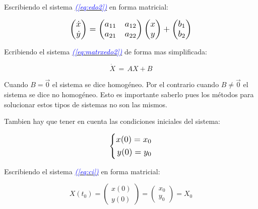 \documentclass[12pt,a4paper]{report} %
\newcommand{\eref}[1]{\hyperref[#1]{\textcolor{blue}{\textit{(\ref*{#1})}}}}
\begin{document}
	Escribiendo el sistema \eref{eq:edo2} en forma matricial:
	
	\begin{equation}
		\label{eq:matrxedo2}
		\scalebox{1.2}{$\displaystyle
		\begin{pmatrix}
			\dot{x}\\
			\dot{y}\\
		\end{pmatrix} =
		\begin{pmatrix}
			a_{11} & a_{12}\\
		    a_{21} & a_{22}\\
		\end{pmatrix} 
		\begin{pmatrix}
			x\\
			y\\
		\end{pmatrix} + 
		\begin{pmatrix}
			b_1\\
			b_2\\
		\end{pmatrix}
		$}
	\end{equation} \smallskip
	
	Ecribiendo el sistema \eref{eq:matrxedo2} de forma mas simplificada:
	
	\begin{equation}
		\label{eq:sisautonomo}
		\dot{X}\,=\,AX+B
	\end{equation}\smallskip
	
	Cuando $B=\vec{0}$ el sistema se dice homogéneo. Por el contrario cuando $B\neq\vec{0}$ el sistema se dice no homogéneo. Esto es importante saberlo pues los métodos para solucionar estos tipos de sistemas no son las mismos.
	
	Tambien hay que tener en cuenta las condiciones iniciales del sistema:
	
	\begin{equation}
		\label{eq:ci}
		\scalebox{1.2}{$\displaystyle
			\left\{
			\begin{aligned}
				x(0)=x_0 \\
			    y(0)=y_0
			\end{aligned}
			\right.
			$}
	\end{equation}\smallskip
	
	Escribiendo el sistema \eref{eq:ci} en forma matricial:
	
	\begin{equation}
		\label{cimat}
		X(t_0)=\begin{pmatrix}
			x(0)\\y(0)
		\end{pmatrix}=\begin{pmatrix}
		x_0\\y_0
		\end{pmatrix}=X_0
	\end{equation}\smallskip
	
\end{document}
